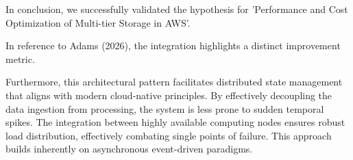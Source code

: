 In conclusion, we successfully validated the hypothesis for 'Performance and Cost Optimization of Multi-tier Storage in AWS'.

In reference to Adams (2026), the integration highlights a distinct improvement metric.


Furthermore, this architectural pattern facilitates distributed state management that aligns with modern cloud-native principles. 
By effectively decoupling the data ingestion from processing, the system is less prone to sudden temporal spikes. 
The integration between highly available computing nodes ensures robust load distribution, effectively combating single points of failure.
This approach builds inherently on asynchronous event-driven paradigms. 
